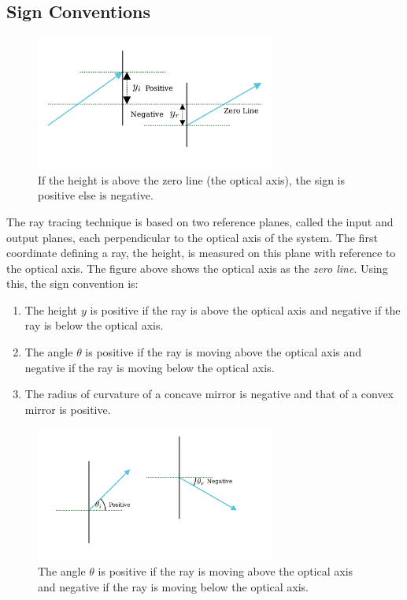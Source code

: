 \documentclass[12pt]{article}
\begin{document}
\subsection{Sign Conventions}
\begin{figure}[h]
    \centering
    \includegraphics[width=0.7\textwidth]{images/sc_y_2.png}
    \caption{If the height is above the zero line (the optical axis), the sign is positive else is negative.}
    \label{fig:sign-y}
\end{figure}
The ray tracing technique is based on two reference planes, called the input and output planes, each perpendicular to the optical axis of the system. The first coordinate defining a ray, the height, is measured on this plane with reference to the optical axis. The figure above shows the optical axis as the \textit{zero line}. Using this, the sign convention is:
\begin{enumerate}
    \item The height \(y\) is positive if the ray is above the optical axis and negative if the ray is below the optical axis.
    \item The angle \(\theta\) is positive if the ray is moving above the optical axis and negative if the ray is moving below the optical axis.
    \item The radius of curvature of a concave mirror is negative and that of a convex mirror is positive.
\end{enumerate}
\begin{figure}[h]
    \centering
    \includegraphics[width=0.7\textwidth]{images/sc_2.png}
    \caption{The angle \(\theta\) is positive if the ray is moving above the optical axis and negative if the ray is moving below the optical axis.}
    \label{fig:sign-theta}
\end{figure}
\end{document}
